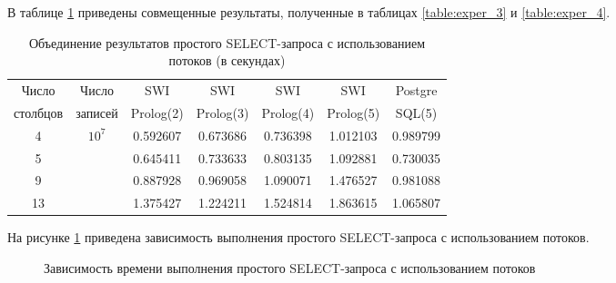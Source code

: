 В таблице \ref{table:exper_5} приведены совмещенные результаты, полученные в таблицах \ref{table:exper_3} и \ref{table:exper_4}.
\clearpage
\begin{table}[ht!]
	\centering
	\captionsetup{singlelinecheck = false, justification=raggedright}
	\caption{Объединение результатов простого SELECT-запроса с использованием потоков (в секундах)}
	\label{table:exper_5}
	\begin{tabular}{|c|c|c|c|c|c|c|}
		\hline
		Число & Число   & SWI         & SWI        & SWI        & SWI        & Postgre  \\ 
	столбцов  & записей & Prolog(2)  & Prolog(3) & Prolog(4) & Prolog(5) & SQL(5)\\ \hline
		4 & \multirow{4}{*}{$10^7$} & 0.592607 & 0.673686 & 0.736398 & 1.012103 & 0.989799\\ 
		5 &                         & 0.645411 & 0.733633 & 0.803135 & 1.092881 & 0.730035\\ 
		9 &   &	0.887928 & 0.969058 & 1.090071 & 1.476527 & 0.981088\\ 
		13 &   & 1.375427 & 1.224211 & 1.524814 & 1.863615 & 1.065807\\ 
        \hline
	\end{tabular}
\end{table} 

На рисунке \ref{image:diagram_5} приведена зависимость выполнения простого SELECT-запроса с использованием потоков.
\begin{figure}[H]
	\centering
	\captionsetup{justification=centering}
	\caption{Зависимость времени выполнения простого SELECT-запроса с использованием потоков} 
	\label{image:diagram_5}
\end{figure} 


